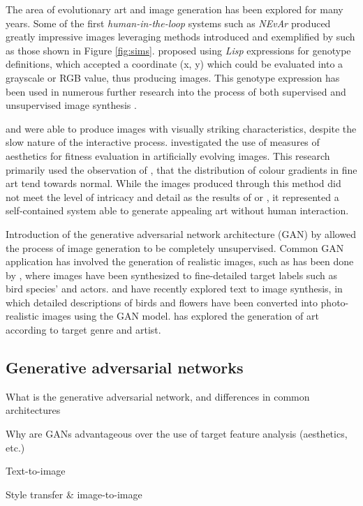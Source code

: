 \documentclass{article}
\begin{document}
The area of evolutionary art and image generation has been explored for many years.
Some of the first \textit{human-in-the-loop} systems such as \textit{NEvAr} \citep{nevar} produced greatly impressive images leveraging methods introduced and exemplified by \citet{sims} such as those shown in Figure \ref{fig:sims}.
\citet{sims} proposed using \textit{Lisp} expressions for genotype definitions, which accepted a coordinate (x, y) which could be evaluated into a grayscale or RGB value, thus producing images.
This genotype expression has been used in numerous further research into the process of both supervised and unsupervised image synthesis \citep{nevar, sims, den2011evolving, distributed-evolutionary-art, aesthetic-measures}.

\citet{sims} and \citet{nevar} were able to produce images with visually striking characteristics, despite the slow nature of the interactive process.
\citet{aesthetic-measures} investigated the use of measures of aesthetics for fitness evaluation in artificially evolving images.
This research primarily used the observation of \citet{ralph-bell-curve}, that the distribution of colour gradients in fine art tend towards normal.
While the images produced through this method did not meet the level of intricacy and detail as the results of \citet{sims} or \citet{nevar}, it represented a self-contained system able to generate appealing art without human interaction.

Introduction of the generative adversarial network architecture (GAN) by \citet{GAN} allowed the process of image generation to be completely unsupervised.
Common GAN application has involved the generation of realistic images, such as has been done by \citet{bao2017cvae}, where images have been synthesized to fine-detailed target labels such as bird species' and actors.
\citet{zhang2017stackgan} and \citet{reed2016generative} have recently explored text to image synthesis, in which detailed descriptions of birds and flowers have been converted into photo-realistic images using the GAN model.
\citet{tan2017artgan} has explored the generation of art according to target genre and artist.

\subsection{Generative adversarial networks}
\begin{todolist}
	\item What is the generative adversarial network, and differences in common architectures
	\item Why are GANs advantageous over the use of target feature analysis (aesthetics, etc.)
	\item Text-to-image
	\item Style transfer \& image-to-image
\end{todolist}
\end{document}
